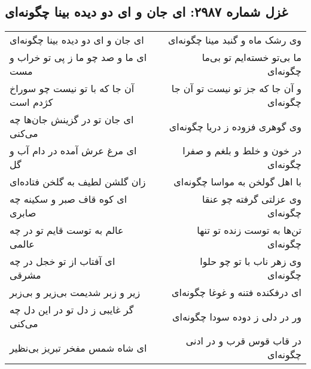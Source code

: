 \begin{center}
\section*{غزل شماره ۲۹۸۷: ای جان و ای دو دیده بینا چگونه‌ای}
\label{sec:2987}
\begin{longtable}{l p{0.5cm} r}
ای جان و ای دو دیده بینا چگونه‌ای
&&
وی رشک ماه و گنبد مینا چگونه‌ای
\\
ای ما و صد چو ما ز پی تو خراب و مست
&&
ما بی‌تو خسته‌ایم تو بی‌ما چگونه‌ای
\\
آن جا که با تو نیست چو سوراخ کژدم است
&&
و آن جا که جز تو نیست تو آن جا چگونه‌ای
\\
ای جان تو در گزینش جان‌ها چه می‌کنی
&&
وی گوهری فزوده ز دریا چگونه‌ای
\\
ای مرغ عرش آمده در دام آب و گل
&&
در خون و خلط و بلغم و صفرا چگونه‌ای
\\
زان گلشن لطیف به گلخن فتاده‌ای
&&
با اهل گولخن به مواسا چگونه‌ای
\\
ای کوه قاف صبر و سکینه چه صابری
&&
وی عزلتی گرفته چو عنقا چگونه‌ای
\\
عالم به توست قایم تو در چه عالمی
&&
تن‌ها به توست زنده تو تنها چگونه‌ای
\\
ای آفتاب از تو خجل در چه مشرقی
&&
وی زهر ناب با تو چو حلوا چگونه‌ای
\\
زیر و زبر شدیمت بی‌زیر و بی‌زبر
&&
ای درفکنده فتنه و غوغا چگونه‌ای
\\
گر غایبی ز دل تو در این دل چه می‌کنی
&&
ور در دلی ز دوده سودا چگونه‌ای
\\
ای شاه شمس مفخر تبریز بی‌نظیر
&&
در قاب قوس قرب و در ادنی چگونه‌ای
\\
\end{longtable}
\end{center}
